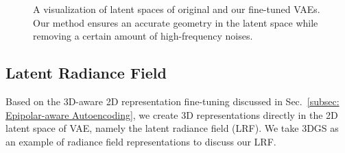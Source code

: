 \begin{figure}[!t]
    \centering
    \vspace{-1em}
    \caption{A visualization of latent spaces of original and our fine-tuned VAEs. Our method ensures an accurate geometry in the latent space while removing a certain amount of high-frequency noises.}
\label{fig: encoder}
\end{figure}



\subsection{Latent Radiance Field}
\label{subsec: Latent Radiance Fields}



Based on the 3D-aware 2D representation fine-tuning discussed in Sec.~\ref{subsec: Epipolar-aware Autoencoding}, we create 3D representations directly in the 2D latent space of VAE, namely the latent radiance field (LRF). We take 3DGS \citep{kerbl3Dgaussians} as an example of radiance field representations to discuss our LRF.  

